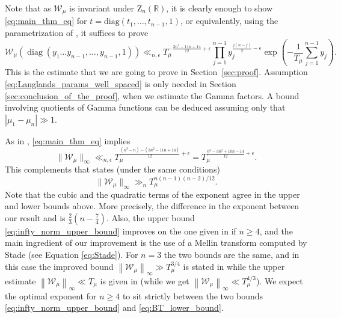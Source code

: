 \documentclass[11pt, oneside]{amsart}
\theoremstyle{plain}
\theoremstyle{remark}
\newcommand{\R}{\mathbb{R}}
\newcommand{\norm}[1]{\left\lVert #1\right\rVert}
\DeclareMathOperator{\diag}{diag}
\begin{document}
Note that as $\mathcal W_\mu$ is invariant under $\mathrm Z_n(\R)$, it
is clearly enough to show \eqref{eq:main_thm_eq} for $t=\mathrm{diag}(t_1,\dots,t_{n-1},1)$,
or equivalently, using the parametrization of \cite{BrTe, Sta90, Sta01, Sta02},
it suffices to prove
\[
\mathcal W_\mu(\diag(y_1\dots y_{n-1},\dots,y_{n-1},1))
\ll_{n,\epsilon}
T_\mu^{-\frac{3n^2-11n+14}{12}+\epsilon}
\prod_{j=1}^{n-1}y_j^{\frac{j(n-j)}2-\epsilon}
\exp \left(-\frac{1}{T_\mu}\sum_{j=1}^{n-1} y_j\right).
\]
This is the estimate that we are going to prove in 
Section~\ref{sec:proof}.  
Assumption \eqref{eq:Langlands_params_well_spaced} is only needed in Section \ref{sec:conclusion_of_the_proof}, when we estimate the Gamma factors. A bound involving quotients of Gamma functions can 
be deduced assuming only that $|\mu_1-\mu_n|\gg1$.

As in  \cite[Theorem 1]{BHM20}, \eqref{eq:main_thm_eq} implies
\begin{equation}\label{eq:infty_norm_upper_bound}
    \|\mathcal W_\mu\|_\infty\ll_{n,\epsilon}
T_\mu^{\frac{(n^3-n)-(3n^2-11n+14)}{12}+\epsilon}=T_\mu^{\frac{n^3-3n^2+10n-14}{12}+\epsilon}.
\end{equation}
This complements \cite[Theorem 1.14]{BrTe} that states 
(under the same conditions)
\begin{equation}\label{eq:BT_lower_bound}
\|\mathcal W_\mu\|_\infty\gg_{n} T_\mu^{n(n-1)(n-2)/12}.    
\end{equation}
Note that the cubic and the quadratic terms of the exponent 
agree in the upper and lower bounds above. 
More precisely, the difference in the exponent between our result and \cite{BrTe} is 
$\frac23(n-\frac74)$.
Also, the upper bound 
 \eqref{eq:infty_norm_upper_bound} improves on the 
 one given in \cite[Remark 1]{BHM20} if $n\geq4$,
 and  the main 
 ingredient of
 our improvement is the use of a Mellin transform computed by Stade (see Equation \eqref{eq:Stade}).  
 For $n=3$ the two bounds are the same,
 and in this case the improved bound 
 $\norm{\mathcal W_\mu}_\infty\gg T_\mu^{3/4}$ is stated in \cite[Theorem 1.9]{BrTe}   
while  the upper estimate $\norm{\mathcal W_\mu}_\infty\ll T_\mu$ is given in
\cite[Lemma 2]{BHM19}
(while we get $\norm{\mathcal W_\mu}_\infty\ll T_\mu^{4/3}$). We expect the optimal exponent for $n\geq4$ to sit strictly between the two bounds \eqref{eq:infty_norm_upper_bound} and \eqref{eq:BT_lower_bound}.
\end{document}
